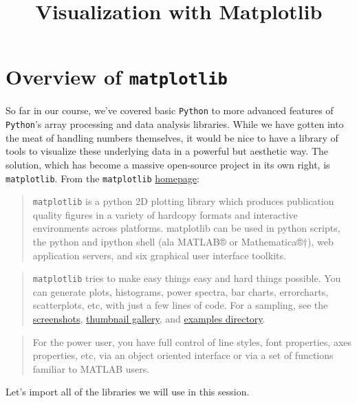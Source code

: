 \documentclass{article}
\title{Visualization with Matplotlib}
\begin{document}
    
    
    \maketitle
    
    

    
    \section{Overview of \texttt{matplotlib}}\label{overview-of-matplotlib}

    So far in our course, we've covered basic \texttt{Python} to more
advanced features of \texttt{Python}'s array processing and data
analysis libraries. While we have gotten into the meat of handling
numbers themselves, it would be nice to have a library of tools to
visualize these underlying data in a powerful but aesthetic way. The
solution, which has become a massive open-source project in its own
right, is \texttt{matplotlib}. From the \texttt{matplotlib}
\href{http://matplotlib.org/1.2.1/index.html}{homepage}:

\begin{quote}
\texttt{matplotlib} is a python 2D plotting library which produces
publication quality figures in a variety of hardcopy formats and
interactive environments across platforms. matplotlib can be used in
python scripts, the python and ipython shell (ala MATLAB® or
Mathematica®†), web application servers, and six graphical user
interface toolkits.
\end{quote}

\begin{quote}
\texttt{matplotlib} tries to make easy things easy and hard things
possible. You can generate plots, histograms, power spectra, bar charts,
errorcharts, scatterplots, etc, with just a few lines of code. For a
sampling, see the
\href{http://matplotlib.org/1.2.1/users/screenshots.html}{screenshots},
\href{http://matplotlib.org/1.2.1/gallery.html}{thumbnail gallery}, and
\href{http://matplotlib.org/1.2.1/examples/index.html}{examples
directory}.
\end{quote}

\begin{quote}
For the power user, you have full control of line styles, font
properties, axes properties, etc, via an object oriented interface or
via a set of functions familiar to MATLAB users.
\end{quote}

    Let's import all of the libraries we will use in this session.
\end{document}
